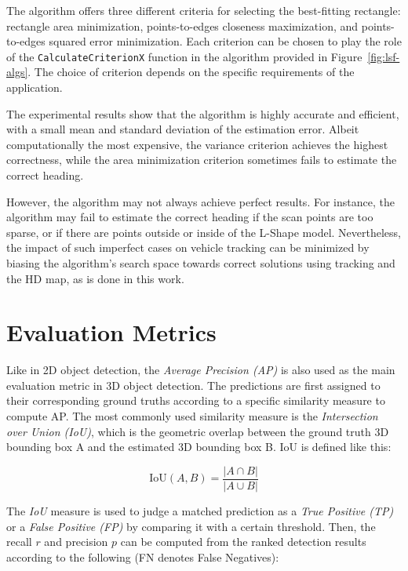 The algorithm offers three different criteria for selecting the best-fitting rectangle: rectangle area minimization, points-to-edges closeness maximization, and points-to-edges squared error minimization.
Each criterion can be chosen to play the role of the \texttt{CalculateCriterionX} function in the algorithm provided in Figure~\ref{fig:lsf-algs}.
The choice of criterion depends on the specific requirements of the application.

The experimental results show that the algorithm is highly accurate and efficient, with a small mean and standard deviation of the estimation error.
Albeit computationally the most expensive, the variance criterion achieves the highest correctness, while the area minimization criterion sometimes fails to estimate the correct heading.

However, the algorithm may not always achieve perfect results.
For instance, the algorithm may fail to estimate the correct heading if the scan points are too sparse, or if there are points outside or inside of the L-Shape model.
Nevertheless, the impact of such imperfect cases on vehicle tracking can be minimized by biasing the algorithm's search space towards correct solutions using tracking and the HD map, as is done in this work.


\section{Evaluation Metrics}
\label{sec:evalmetrics}

Like in 2D object detection, the \textit{Average Precision (AP)} is also used as the main evaluation metric in 3D object detection.
The predictions are first assigned to their corresponding ground truths according to a specific similarity measure to compute AP\@.
The most commonly used similarity measure is the \textit{Intersection over Union (IoU)}, which is the geometric overlap between the ground truth 3D bounding box A and the estimated 3D bounding box B\@.
IoU is defined like this:

\[
\text{IoU}(A,B) = \frac{|A \cap B|}{|A \cup B|}
\]

The \textit{IoU} measure is used to judge a matched prediction as a \textit{True Positive (TP)} or a \textit{False Positive (FP)} by comparing it with a certain threshold.
Then, the recall $r$ and precision $p$ can be computed from the ranked detection results according to the following (FN denotes False Negatives):

